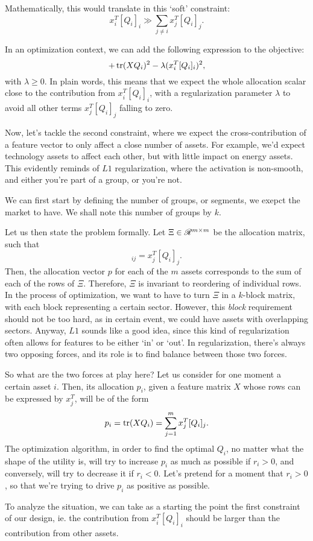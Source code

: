 Mathematically, this would translate in this `soft' constraint:
\begin{equation}
  x_i^{T}[Q_i]_i \gg \sum_{j\neq i}x_j^{T}[Q_i]_j.
\end{equation}

In an optimization context, we can add the following expression to the objective:
\begin{equation}
  +\operatorname{tr}(XQ_i)^2 - \lambda(x_i^T[Q_i]_i)^2,
\end{equation}
with $\lambda \geq0$. In plain words, this means that we expect the whole allocation
scalar close to the contribution from $x_i^T[Q_i]_i$, with a regularization parameter
$\lambda$ to avoid all other terms $x_j^{T}[Q_i]_j$ falling to zero. 

Now, let's tackle the second constraint, where we expect the cross-contribution of a
feature vector to only affect a close number of assets. For example, we'd expect
technology assets to affect each other, but with little impact on energy assets. This
evidently reminds of $L1$ regularization, where the activation is non-smooth, and either
you're part of a group, or you're not. 

We can first start by defining the number of groups, or segments, we exepct the market to
have. We shall note this number of groups by $k$. 

Let us then state the problem formally. Let $\Xi \in \mathscr{R}^{m\times{}m}$ be the allocation
matrix, such that
\begin{equation}
  [\Xi]_{ij} = x_{j}^{T}[Q_i]_j.
\end{equation}
Then, the allocation vector $p$ for each of the $m$ assets corresponds to the sum of each
of the rows of $\Xi$. Therefore, $\Xi$ is invariant to reordering of individual rows. In
the process of optimization, we want to have to turn $\Xi$ in a $k$-block matrix, with
each block representing a certain sector. However, this \textit{block} requirement should
not be too hard, as in certain event, we could have assets with overlapping
sectors. Anyway, $L1$ sounds like a good idea, since this kind of regularization often
allows for features to be either `in' or `out'. In regularization, there's always two
opposing forces, and its role is to find balance between those two forces. 

So what are the two forces at play here? Let us consider for one moment a certain asset
$i$. Then, its allocation $p_i$, given a feature matrix $X$ whose rows can be expressed by
$x_j^{T}$, will be of the form
\begin{equation}
  p_i = \operatorname{tr}(XQ_i) = \sum_{j=1}^m x_j^{T}[Q_i]_j.
\end{equation}
The optimization algorithm, in order to find the optimal $Q_i$, no matter what the shape
of the utility is, will try to increase $p_i$ as much as possible if $r_i>0$, and
conversely, will try to decrease it if $r_i<0$. Let's pretend for a moment that $r_i>0$,
so that we're trying to drive $p_i$ as positive as possible. 

To analyze the situation, we can take as a starting the point the first constraint of our
design, ie. the contribution from $x_i^T[Q_i]_i$ should be larger than the contribution
from other assets. 